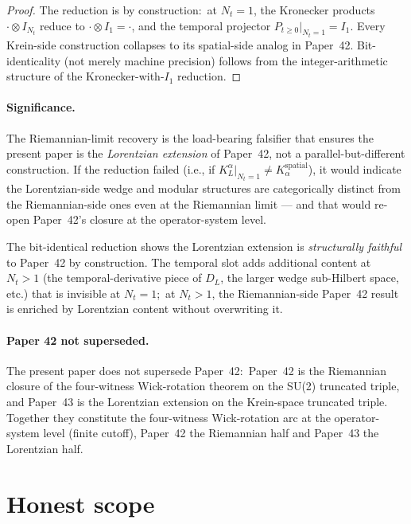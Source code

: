 \documentclass[11pt,a4paper]{article}
\theoremstyle{plain}
\theoremstyle{definition}
\newcommand{\Nt}{N_t}
\newcommand{\DL}{D_{L}}
\newcommand{\KL}{K_{L}}
\begin{document}
\begin{proof}
The reduction is by construction:\ at $\Nt = 1$, the Kronecker products
$\cdot \otimes I_{\Nt}$ reduce to $\cdot \otimes I_1 = \cdot$, and the
temporal projector $P_{t \ge 0}|_{\Nt = 1} = I_1$. Every Krein-side
construction collapses to its spatial-side analog in Paper~42.
Bit-identicality (not merely machine precision) follows from the
integer-arithmetic structure of the Kronecker-with-$I_1$ reduction.
\end{proof}

\paragraph{Significance.} The Riemannian-limit recovery is the
load-bearing falsifier that ensures the present paper is the
\emph{Lorentzian extension} of Paper~42, not a parallel-but-different
construction. If the reduction failed (i.e., if $\KL^\alpha|_{\Nt = 1}
\ne K_\alpha^{\mathrm{spatial}}$), it would indicate the Lorentzian-side
wedge and modular structures are categorically distinct from the
Riemannian-side ones even at the Riemannian limit — and that would
re-open Paper~42's closure at the operator-system level.

The bit-identical reduction shows the Lorentzian extension is
\emph{structurally faithful} to Paper~42 by construction. The temporal
slot adds additional content at $\Nt > 1$ (the
temporal-derivative piece of $\DL$, the larger wedge sub-Hilbert
space, etc.) that is invisible at $\Nt = 1$;\ at $\Nt > 1$, the
Riemannian-side Paper~42 result is enriched by Lorentzian content
without overwriting it.

\paragraph{Paper 42 not superseded.} The present paper does not
supersede Paper~42:\ Paper~42 is the Riemannian closure of the
four-witness Wick-rotation theorem on the SU(2) truncated triple, and
Paper~43 is the Lorentzian extension on the Krein-space truncated
triple. Together they constitute the four-witness Wick-rotation arc
at the operator-system level (finite cutoff), Paper~42 the Riemannian
half and Paper~43 the Lorentzian half.

\section{Honest scope}\label{sec:honest_scope}
\end{document}
